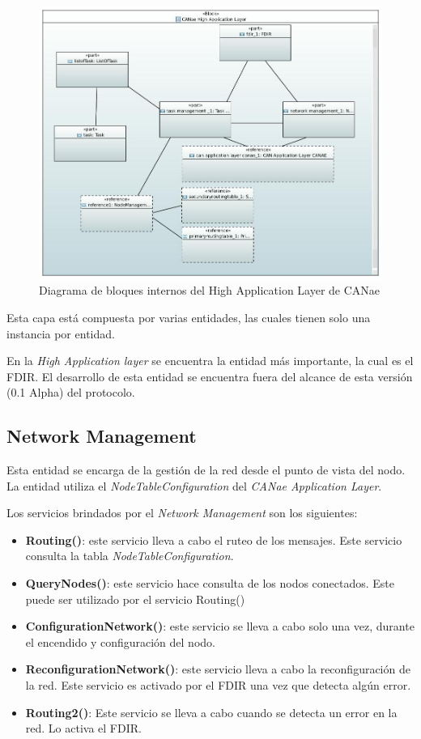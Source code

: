 \begin{figure}[h!]
 \centering
 \includegraphics[scale=0.4]{images/Secciones/AppendixA/Internal_CAN_High_Application_Layer.JPG}
  \caption{Diagrama de bloques internos del High Application Layer de CANae}
\label{fig:HighAppLayerInternalBlock}
\end{figure}

Esta capa está compuesta por varias entidades, las cuales tienen solo una
instancia por entidad.

En la \textit{High Application layer} se encuentra la entidad más importante, la
cual es el \ac{FDIR}. El desarrollo de esta entidad se encuentra fuera del
alcance de esta versión (0.1 Alpha) del protocolo.

\subsection{Network Management}
Esta entidad se encarga de la gestión de la red desde el punto de vista del
nodo. La entidad utiliza el \textit{NodeTableConfiguration} del
\textit{CANae Application Layer}.

Los servicios brindados por el \textit{Network Management} son los siguientes:
\begin{itemize}
\item \textbf{Routing()}: este servicio lleva a cabo el ruteo de los mensajes.
  Este servicio consulta la tabla \textit{NodeTableConfiguration}.
\item \textbf{QueryNodes()}: este servicio hace consulta de los nodos
  conectados. Este puede ser utilizado por el servicio Routing()
\item \textbf{ConfigurationNetwork()}: este servicio se lleva a cabo solo una
  vez, durante el encendido y configuración del nodo. 
\item \textbf{ReconfigurationNetwork()}: este servicio lleva a cabo la
  reconfiguración de la red. Este servicio es activado por el \ac{FDIR} una vez
  que detecta algún error.
\item \textbf{Routing2()}: Este servicio se lleva a cabo cuando se detecta un
  error en la red. Lo activa el \ac{FDIR}. 
\end{itemize}

